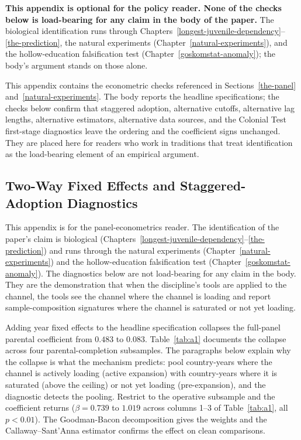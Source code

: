 \documentclass[12pt,letterpaper]{article}
\begin{document}
{\renewcommand{\thetable}{A\arabic{table}}%
\setcounter{table}{0}

\textbf{This appendix is optional for the policy reader. None of the
checks below is load-bearing for any claim in the body of the paper.}
The biological identification runs through
Chapters~\ref{longest-juvenile-dependency}--\ref{the-prediction}, the
natural experiments (Chapter~\ref{natural-experiments}), and the
hollow-education falsification test
(Chapter~\ref{goskomstat-anomaly}); the body's argument stands on
those alone.

This appendix contains the econometric checks referenced in
Sections~\ref{the-panel} and~\ref{natural-experiments}. The body
reports the headline specifications; the checks below confirm that
staggered adoption, alternative cutoffs, alternative lag lengths,
alternative estimators, alternative data sources, and the Colonial
Test first-stage diagnostics leave the ordering and the coefficient
signs unchanged. They are placed here for readers who work in
traditions that treat identification as the load-bearing element of
an empirical argument.

\subsection{Two-Way Fixed Effects and Staggered-Adoption Diagnostics}\label{appendix-twfe}

\noindent This appendix is for the panel-econometrics reader. The
identification of the paper's claim is biological
(Chapters~\ref{longest-juvenile-dependency}--\ref{the-prediction}) and
runs through the natural experiments
(Chapter~\ref{natural-experiments}) and the hollow-education
falsification test (Chapter~\ref{goskomstat-anomaly}). The diagnostics
below are not load-bearing for any claim in the body. They are the
demonstration that when the discipline's tools are applied to the
channel, the tools see the channel where the channel is loading and
report sample-composition signatures where the channel is saturated or
not yet loading.

\noindent Adding year fixed effects to the headline specification
collapses the full-panel parental coefficient from $0.483$ to $0.083$.
Table~\ref{tab:a1} documents the collapse across four
parental-completion subsamples. The paragraphs below explain why the
collapse is what the mechanism predicts: pool country-years where the
channel is actively loading (active expansion) with country-years
where it is saturated (above the ceiling) or not yet loading
(pre-expansion), and the diagnostic detects the pooling. Restrict to
the operative subsample and the coefficient returns ($\beta = 0.739$
to $1.019$ across columns 1--3 of Table~\ref{tab:a1}, all $p<0.01$).
The Goodman-Bacon decomposition gives the weights and the
Callaway--Sant'Anna estimator confirms the effect on clean
comparisons.

}
\end{document}
